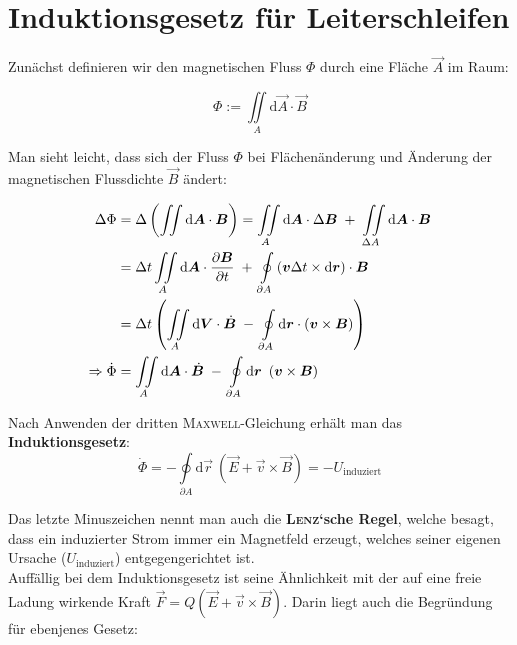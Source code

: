 \section{Induktionsgesetz für Leiterschleifen}

Zunächst definieren wir den magnetischen Fluss $\Phi$ durch eine Fläche $\vec{A}$ im Raum:

\begin{equation*}
\Phi := \iint\limits_A\mathrm{d}\vec{A}\cdot\vec{B}
\end{equation*}

Man sieht leicht, dass sich der Fluss $\Phi$ bei Flächenänderung und Änderung der magnetischen Flussdichte $\vec{B}$ ändert:

\begin{align*}
\Delta\Phi &=  \Delta\left(\iint\mathrm{d}\vec{A}\cdot\vec{B}\right) = \iint\limits_A\mathrm{d}\vec{A}\cdot\Delta\vec{B} \; + \; \iint\limits_{\Delta A}\mathrm{d}\vec{A}\cdot\vec{B}\\
&= \Delta t \iint\limits_A\mathrm{d}\vec{A}\cdot\pdiff{\vec{B}}{t} \; + \; \oint\limits_{\partial A}\left(\vec{v}\Delta t\times\mathrm{d}\vec{r}\right)\cdot\vec{B}\\
&= \Delta t\left(\iint\limits_A\mathrm{d}\vec{V}\cdot\dot{\vec{B}} \; - \; \oint\limits_{\partial A}\mathrm{d}\vec{r}\cdot\left(\vec{v}\times\vec{B}\right)\right)\\
\Rightarrow \dot{\Phi} &= \iint\limits_A\mathrm{d}\vec{A}\cdot\dot{\vec{B}} \; - \; \oint\limits_{\partial A}\mathrm{d}\vec{r} \ \left(\vec{v}\times\vec{B}\right)
\end{align*}

Nach Anwenden der dritten \textsc{Maxwell}-Gleichung erhält man das \textbf{Induktionsgesetz}:
\begin{equation*}
\dot{\Phi} = - \oint\limits_{\partial A}\mathrm{d}\vec{r} \ \left(\vec{E} + \vec{v}\times\vec{B}\right) = - U_{\mathrm{induziert}}
\end{equation*}

Das letzte Minuszeichen nennt man auch die \textbf{\textsc{Lenz}`sche Regel}, welche besagt, dass ein induzierter Strom immer ein Magnetfeld erzeugt, welches seiner eigenen Ursache ($U_{\mathrm{induziert}}$) entgegengerichtet ist.
\ \\
Auffällig bei dem Induktionsgesetz ist seine Ähnlichkeit mit der auf eine freie Ladung wirkende Kraft $\vec{F} = Q(\vec{E} + \vec{v}\times\vec{B})$. Darin liegt auch die Begründung für ebenjenes Gesetz:\

